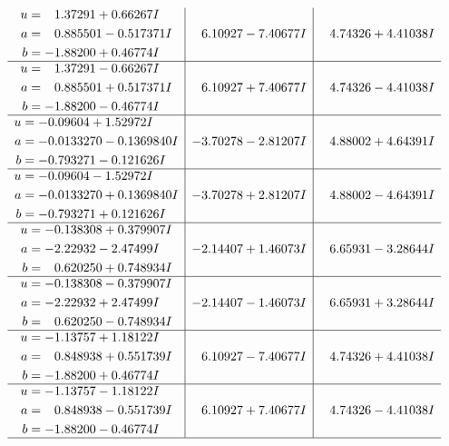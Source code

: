 \documentclass[1p]{elsarticle_modified}
\theoremstyle{definition}
\begin{document}
$$\begin{array}{c|c|c}
\begin{aligned}
u &= \phantom{-}1.37291 + 0.66267 I \\
a &= \phantom{-}0.885501 - 0.517371 I \\
b &= -1.88200 + 0.46774 I\end{aligned}
 & \phantom{-}6.10927 - 7.40677 I & \phantom{-}4.74326 + 4.41038 I \\ \hline\begin{aligned}
u &= \phantom{-}1.37291 - 0.66267 I \\
a &= \phantom{-}0.885501 + 0.517371 I \\
b &= -1.88200 - 0.46774 I\end{aligned}
 & \phantom{-}6.10927 + 7.40677 I & \phantom{-}4.74326 - 4.41038 I \\ \hline\begin{aligned}
u &= -0.09604 + 1.52972 I \\
a &= -0.0133270 - 0.1369840 I \\
b &= -0.793271 - 0.121626 I\end{aligned}
 & -3.70278 - 2.81207 I & \phantom{-}4.88002 + 4.64391 I \\ \hline\begin{aligned}
u &= -0.09604 - 1.52972 I \\
a &= -0.0133270 + 0.1369840 I \\
b &= -0.793271 + 0.121626 I\end{aligned}
 & -3.70278 + 2.81207 I & \phantom{-}4.88002 - 4.64391 I \\ \hline\begin{aligned}
u &= -0.138308 + 0.379907 I \\
a &= -2.22932 - 2.47499 I \\
b &= \phantom{-}0.620250 + 0.748934 I\end{aligned}
 & -2.14407 + 1.46073 I & \phantom{-}6.65931 - 3.28644 I \\ \hline\begin{aligned}
u &= -0.138308 - 0.379907 I \\
a &= -2.22932 + 2.47499 I \\
b &= \phantom{-}0.620250 - 0.748934 I\end{aligned}
 & -2.14407 - 1.46073 I & \phantom{-}6.65931 + 3.28644 I \\ \hline\begin{aligned}
u &= -1.13757 + 1.18122 I \\
a &= \phantom{-}0.848938 + 0.551739 I \\
b &= -1.88200 + 0.46774 I\end{aligned}
 & \phantom{-}6.10927 - 7.40677 I & \phantom{-}4.74326 + 4.41038 I \\ \hline\begin{aligned}
u &= -1.13757 - 1.18122 I \\
a &= \phantom{-}0.848938 - 0.551739 I \\
b &= -1.88200 - 0.46774 I\end{aligned}
 & \phantom{-}6.10927 + 7.40677 I & \phantom{-}4.74326 - 4.41038 I\\
 \hline 
 \end{array}$$\newpage\newpage\renewcommand{\arraystretch}{1}
\end{document}
